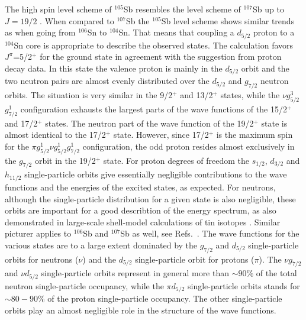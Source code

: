 The high spin level scheme of $^{105}$Sb resembles the level scheme of
$^{107}$Sb up to $J=19/2$ \cite{sb107}. 
When compared to $^{107}$Sb the $^{105}$Sb
level scheme shows similar trends as when going from $^{106}$Sn to
$^{104}$Sn. That means that coupling a $d_{5/2}$ proton to a 
$^{104}$Sn core is appropriate to describe the observed states.
The calculation favors $J^{\pi}$=5/2$^+$ for the ground state in
agreement with the suggestion from proton decay data.
In this state the valence proton is mainly in the $d_{5/2}$
orbit and the two neutron pairs are almost evenly distributed
over the $d_{5/2}$ and $g_{7/2}$ neutron orbits. The situation
is very similar in the 9/2$^+$ and 13/2$^+$ states, while 
the $\nu$$g_{5/2}^3$$g_{7/2}^1$ configuration exhausts the
largest parts of the wave functions of the 15/2$^+$ and 17/2$^+$ 
states. The neutron part of the wave function of the 19/2$^+$
state is almost identical to the 17/2$^+$ state. However,
since 17/2$^+$ is the maximum spin for the 
$\pi$$g_{5/2}^1$$\nu$$g_{5/2}^1$$g_{7/2}^1$ configuration,
the odd proton resides almost exclusively in the $g_{7/2}$
orbit in the 19/2$^+$ state. 
For proton degrees of freedom
the $s_{1/2}$, $d_{3/2}$ and $h_{11/2}$ single-particle 
orbits give essentially negligible
contributions to the wave functions and the energies of the excited
states, as expected. For neutrons, although
the single-particle distribution for a given state is also negligible,
these orbits are important for a good describtion of the energy spectrum,
as also demonstrated in large-scale shell-model calculations of
tin isotopes \cite{ehho98}.
Similar picturer applies to $^{106}$Sb and $^{107}$Sb as well, 
see Refs.~\cite{sb106,sb107}.
The wave functions for the various states are to a large extent
dominated by the $g_{7/2}$ and $d_{5/2}$ single-particle orbits
for neutrons ($\nu$)
and the $d_{5/2}$ single-particle
orbit for protons ($\pi$). 
The $\nu g_{7/2}$ and $\nu d_{5/2}$ single-particle orbits represent
in general more than $\sim 90\%$ of the total neutron single-particle
occupancy, while the  $\pi d_{5/2}$ single-particle orbits stands for 
$\sim 80-90\%$ of the proton single-particle occupancy. 
The other single-particle
orbits play  an almost negligible role in the structure of the wave functions.
